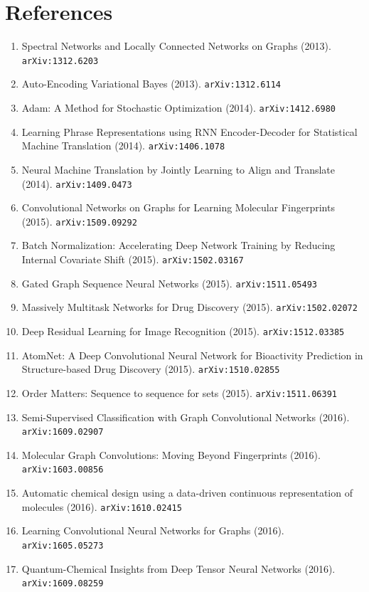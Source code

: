 \documentclass[11pt]{article}
\begin{document}
\section*{References}
\begin{enumerate}\small
  \item Spectral Networks and Locally Connected Networks on Graphs (2013). \texttt{arXiv:1312.6203}
  \item Auto-Encoding Variational Bayes (2013). \texttt{arXiv:1312.6114}
  \item Adam: A Method for Stochastic Optimization (2014). \texttt{arXiv:1412.6980}
  \item Learning Phrase Representations using RNN Encoder-Decoder for
  Statistical Machine Translation (2014). \texttt{arXiv:1406.1078}
  \item Neural Machine Translation by Jointly Learning to Align and Translate (2014). \texttt{arXiv:1409.0473}
  \item Convolutional Networks on Graphs for Learning Molecular Fingerprints (2015). \texttt{arXiv:1509.09292}
  \item Batch Normalization: Accelerating Deep Network Training by Reducing
  Internal Covariate Shift (2015). \texttt{arXiv:1502.03167}
  \item Gated Graph Sequence Neural Networks (2015). \texttt{arXiv:1511.05493}
  \item Massively Multitask Networks for Drug Discovery (2015). \texttt{arXiv:1502.02072}
  \item Deep Residual Learning for Image Recognition (2015). \texttt{arXiv:1512.03385}
  \item AtomNet: A Deep Convolutional Neural Network for Bioactivity Prediction
  in Structure-based Drug Discovery (2015). \texttt{arXiv:1510.02855}
  \item Order Matters: Sequence to sequence for sets (2015). \texttt{arXiv:1511.06391}
  \item Semi-Supervised Classification with Graph Convolutional Networks (2016). \texttt{arXiv:1609.02907}
  \item Molecular Graph Convolutions: Moving Beyond Fingerprints (2016). \texttt{arXiv:1603.00856}
  \item Automatic chemical design using a data-driven continuous representation
  of molecules (2016). \texttt{arXiv:1610.02415}
  \item Learning Convolutional Neural Networks for Graphs (2016). \texttt{arXiv:1605.05273}
  \item Quantum-Chemical Insights from Deep Tensor Neural Networks (2016). \texttt{arXiv:1609.08259}

\end{enumerate}
\end{document}
